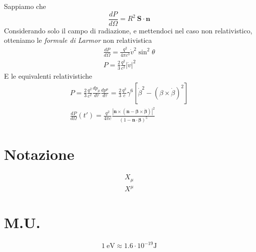 \documentclass[a4paper, twocolumn]{article}
\begin{document}
Sappiamo che
\begin{equation}
  \label{eq:27}
  \frac{dP}{d\Omega}=R^2~ \mathbf{S}\cdot\mathbf{n}
\end{equation}
Considerando solo il campo di radiazione, e mettendoci nel caso non relativistico, otteniamo le \emph{formule di Larmor} non relativistica
\begin{align}
  \label{eq:26}
  \frac{dP}{d\Omega}=\frac{q^2}{4\pi c^3}\dot{v}^2\sin^2\theta \\
  P=\frac{2}{3}\frac{q^2}{c^2}\left| \dot{v}\right|^2
\end{align}
E le equivalenti relativistiche
\begin{align}
  \label{eq:28}
  P=\frac{2}{3}\frac{q^2}{c^2} \frac{dp_\mu}{d\tau} \frac{dp^\mu}{d\tau}=\frac{2}{3}\frac{q^2}{c}\gamma^6[\dot{\beta}^2-(\beta\times\dot{\beta})^2] \\
  \frac{dP}{d\Omega}(t')=\frac{q^2}{4\pi c}\frac{\left|\mathbf{n}\times(\mathbf{n}-\mathbf{\beta}\times\dot{\mathbf{\beta}})   \right|^2}{(1-\mathbf{n}\cdot\mathbf{\beta})^5}
\end{align}





\section{Notazione}
\label{sec:notazione}
\begin{align}
  \label{eq:11}
  X_{\mu} \tag*{covariante} \\
  X^{\mu} \tag*{controvariante} 
\end{align}


\section{M.U.}
\begin{equation}
	1 ~\mathrm{eV} \approx 1.6 \cdot 10^{-19} \mathrm{J}
\end{equation}
\end{document}
